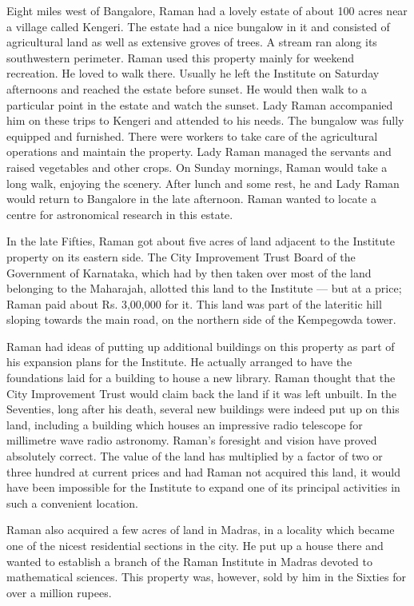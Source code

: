 Eight miles west of Bangalore, Raman had a lovely estate
of about 100 acres near a village called Kengeri. The estate had
a nice bungalow in it and consisted of agricultural land as well
as extensive groves of trees. A stream ran along its southwestern
perimeter. \hbox{Raman} used this property mainly for weekend
recreation. He loved to walk there. Usually he left the Institute
on Saturday afternoons and reached the estate before sunset.
He would then walk to a particular point in the estate and watch
the sunset. Lady Raman accompanied him on these trips to
Kengeri and attended to his needs. The bungalow was fully
equipped and furnished. There were workers to take care of the
agricultural operations and maintain the property. Lady Raman
managed the servants and raised vegetables and other crops.
On Sunday mornings, Raman would take a long walk, enjoying
the scenery. After lunch and some rest, he and Lady Raman
would return to Bangalore in the late afternoon. Raman wanted
to locate a centre for astronomical research in this estate.

In the late Fifties, Raman got about five acres of land
adjacent to the Institute property on its eastern side. The City
Improvement Trust Board of the Government of Karnataka,
which had by then taken over most of the land belonging to the
Maharajah, allotted this land to the Institute --- but at a price;
Raman paid about Rs. 3,00,000 for it. This land was part of the
lateritic hill sloping towards the main road, on the northern side
of the Kempegowda tower.

Raman had ideas of putting up additional buildings on this
property as part of his expansion plans for the Institute.
He actually arranged to have the foundations laid for a building
to house a new library. Raman thought that the City Improvement
Trust would claim back the land if it was left unbuilt. In the
Seventies, long after his death, several new buildings were indeed
put up on this land, including a building which houses an
impressive radio telescope for millimetre wave radio astronomy.
Raman's foresight and vision have proved absolutely correct.
The value of the land has multiplied by a factor of two or three
hundred at current prices and had Raman not acquired this land,
it would have been impossible for the Institute to expand one
of its principal activities in such a convenient location.

Raman also acquired a few acres of land in Madras, in a
locality which became one of the nicest residential sections in the
city. He put up a house there and wanted to establish a branch
of the Raman Institute in Madras devoted to mathematical
sciences. This property was, however, sold by him in the Sixties
for over a million rupees.

